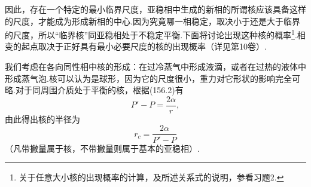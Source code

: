 因此，存在一个特定的最小临界尺度，亚稳相中生成的新相的所谓核应该具备这样的尺度，才能成为形成新相的中心.因为究竟哪一相稳定，取决小于还是大于临界的尺度，所以“临界核”同亚稳相处于不稳定平衡.下面将讨论出现这种核的概率\footnote{关于任意大小核的出现概率的计算，及所述关系式的说明，参看习题2.}.相变的起点取决于正好具有最小必要尺度的核的出现概率（详见第10卷）.

我们考虑在各向同性相中核的形成：在过冷蒸气中形成液滴，或者在过热的液体中形成蒸气泡.核可以认为是球形，因为它的尺度很小，重力对它形状的影响完全可略.对于同周围介质处于平衡的核，根据(156.2)有
\begin{equation*}
  P'-P=\frac{2\alpha}{r},
\end{equation*}
由此得出核的半径为
\begin{equation}
  r_c=\frac{2\alpha}{P'-P}
\end{equation}
（凡带撇量属于核，不带撇量则属于基本的亚稳相）.

